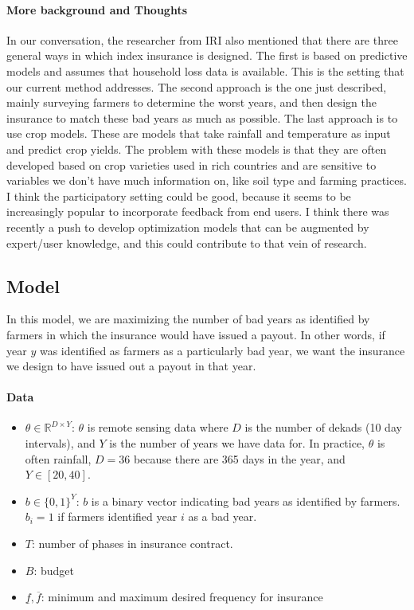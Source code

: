 \documentclass[11pt]{article}
\begin{document}
    \paragraph{More background and Thoughts} In our conversation, the researcher from IRI also mentioned that there are three general ways in which index insurance is designed. The first is based on predictive models and assumes that household loss data is available. This is the setting that our current method addresses. The second approach is the one just described, mainly surveying farmers to determine the worst years, and then design the insurance to match these bad years as much as possible. The last approach is to use crop models. These are models that take rainfall and temperature as input and predict crop yields. The problem with these models is that they are often developed based on crop varieties used in rich countries and are sensitive to variables we don't have much information on, like soil type and farming practices. I think the participatory setting could be good, because it seems to be increasingly popular to incorporate feedback from end users. I think there was recently a push to develop optimization models that can be augmented by expert/user knowledge, and this could contribute to that vein of research. 

  \subsection{Model}
  In this model, we are maximizing the number of bad years as identified by farmers in which the insurance would have issued a payout. In other words, if year $y$ was identified as farmers as a particularly bad year, we want the insurance we design to have issued out a payout in that year.  

    \paragraph{Data}
      \begin{itemize}
        \item $\theta \in \mathbb{R}^{D \times Y}$: $\theta$ is remote sensing data where $D$ is the number of dekads (10 day intervals), and $Y$ is the number of years we have data for. In practice, $\theta$ is often rainfall, $D=36$ because there are 365 days in the year, and $Y\in [20,40]$.
        \item $b \in \{ 0,1\}^Y$: $b$ is a binary vector indicating bad years as identified by farmers. $b_i = 1$ if farmers identified year $i$ as a bad year. 
        \item $T$: number of phases in insurance contract. 
        \item $B$: budget 
        \item $\underline{f}, \overline{f}$: minimum and maximum desired frequency for insurance
      \end{itemize}
\end{document}
